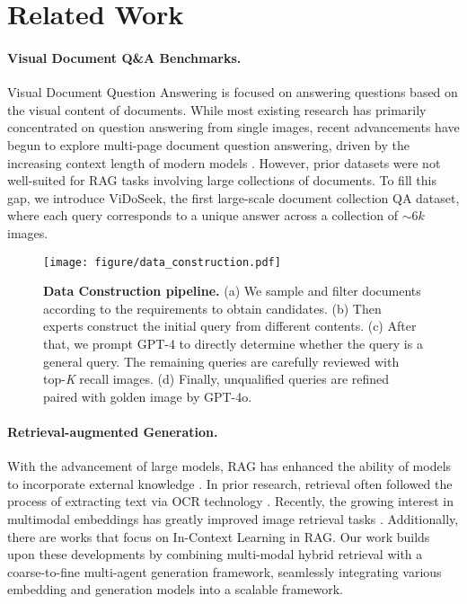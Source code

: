 \section{Related Work}

\paragraph{Visual Document Q\&A Benchmarks.}
Visual Document Question Answering is focused on answering questions based on the visual content of documents\cite{antol2015vqa,ye2024mplug,wang2024leave}. While most existing research \cite{methani2020plotqa, masry2022chartqa, li2024multimodal, mathew2022infographicvqa} has primarily concentrated on question answering from single images, recent advancements have begun to explore multi-page document question answering, driven by the increasing context length of modern models \cite{mathew2021docvqa, ma2024mmlongbenchdocbenchmarkinglongcontextdocument, tanaka2023slidevqa}. However, prior datasets were not well-suited for RAG tasks involving large collections of documents. To fill this gap, we introduce ViDoSeek, the first large-scale document collection QA dataset, where each query corresponds to a unique answer across a collection of $\sim 6k$ images.

\begin{figure*}[t]
    \centering 
    \texttt{[image: figure/data\_construction.pdf]}
    \caption{\textbf{Data Construction pipeline.} (a) We sample and filter documents according to the requirements to obtain candidates. (b) Then experts construct the initial query from different contents. (c) After that, we prompt GPT-4 to directly determine whether the query is a general query. The remaining queries are carefully reviewed with top-\textit{K} recall images. (d) Finally, unqualified queries are refined paired with golden image by GPT-4o.}
    \label{fig:construction_pipeline}
\end{figure*}

\paragraph{Retrieval-augmented Generation.}
With the advancement of large models, RAG has enhanced the ability of models to incorporate external knowledge \cite{lewis2020retrieval,chen2024mindsearch,wu2025webwalker}. In prior research, retrieval often followed the process of extracting text via OCR technology \cite{chen2024bge,lee2024nv,robertson2009probabilistic}. Recently, the growing interest in multimodal embeddings has greatly improved image retrieval tasks \cite{faysse2024colpali,yu2024visrag}. 
Additionally, there are works that focus on In-Context Learning in RAG\cite{agarwal2025many,yue2024inference,team2024gemini,weijia2023replug}.
Our work builds upon these developments by combining multi-modal hybrid retrieval with a coarse-to-fine multi-agent generation framework, seamlessly integrating various embedding and generation models into a scalable framework.

